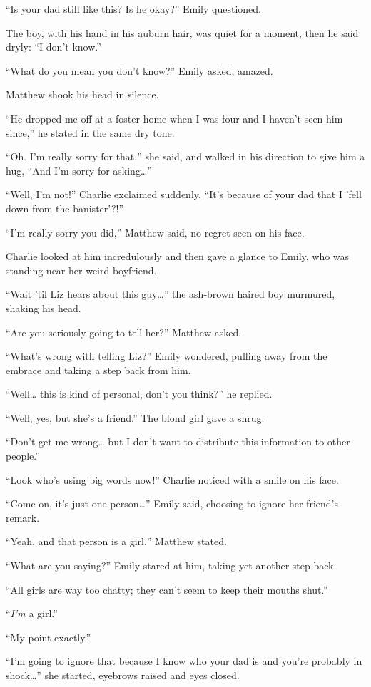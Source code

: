 “Is your dad still like this? Is he okay?” Emily questioned.

The boy, with his hand in his auburn hair, was quiet for a moment, then he said dryly: “I don't know.”

“What do you mean you don't know?” Emily asked, amazed.

Matthew shook his head in silence.

“He dropped me off at a foster home when I was four and I haven't seen him since,” he stated in the same dry tone.

“Oh. I'm really sorry for that,” she said, and walked in his direction to give him a hug, “And I'm sorry for asking…”

“Well, I'm not!” Charlie exclaimed suddenly, “It's because of your dad that I 'fell down from the banister'?!”

“I'm really sorry you did,” Matthew said, no regret seen on his face.

Charlie looked at him incredulously and then gave a glance to Emily, who was standing near her weird boyfriend.

“Wait 'til Liz hears about this guy…” the ash-brown haired boy murmured, shaking his head.

“Are you seriously going to tell her?” Matthew asked.

“What's wrong with telling Liz?” Emily wondered, pulling away from the embrace and taking a step back from him.

“Well… this is kind of personal, don't you think?” he replied.

“Well, yes, but she's a friend.” The blond girl gave a shrug.

“Don't get me wrong… but I don't want to distribute this information to other people.”

“Look who's using big words now!” Charlie noticed with a smile on his face.

“Come on, it's just one person…” Emily said, choosing to ignore her friend's remark.

“Yeah, and that person is a girl,” Matthew stated.

“What are you saying?” Emily stared at him, taking yet another step back.

“All girls are way too chatty; they can't seem to keep their mouths shut.”

“\textit{I'm} a girl.”

“My point exactly.”

“I'm going to ignore that because I know who your dad is and you're probably in shock…” she started, eyebrows raised and eyes closed.

